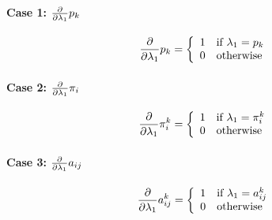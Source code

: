 \documentclass[a4paper,12pt,doc]{apaIngmar} %
\begin{document}
\paragraph{Case 1: $\frac{\partial} {\partial \lambda_{1}} p_{k}$}

\begin{align} 
        \frac{\partial} {\partial \lambda_{1}} p_{k} = \left\{ \begin{array}{ll} 
            1 & \mbox{if $\lambda_{1}=p_{k}$} \\ 
            0 & \mbox{otherwise} 
            \end{array} \right. 
\end{align} 


\paragraph{Case 2: $\frac{\partial} {\partial \lambda_{1}} \pi_{i}$ }

\begin{align} 
        \frac{\partial} {\partial \lambda_{1}} \pi_{i}^{k} = \left\{ \begin{array}{ll} 
            1 & \mbox{if $\lambda_{1}=\pi_{i}^{k}$} \\ 
            0 & \mbox{otherwise} 
            \end{array} \right. 
\end{align} 

\paragraph{Case 3: $\frac{\partial} {\partial \lambda_{1}} a_{ij}$ }

\begin{align} 
        \frac{\partial} {\partial \lambda_{1}} a_{ij}^{k}= \left\{ \begin{array}{ll} 
            1 & \mbox{if $\lambda_{1}=a_{ij}^{k}$} \\ 
            0 & \mbox{otherwise} 
            \end{array} \right. 
\end{align} 
\end{document}

